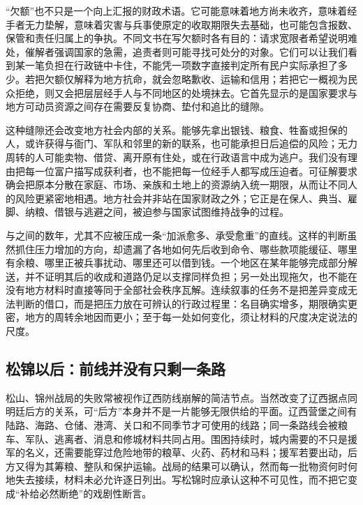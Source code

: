 “欠额”也不只是一个向上汇报的财政术语。它可能意味着地方尚未收齐，意味着经手者无力垫解，意味着灾害与兵事使原定的收取期限失去基础，也可能包含报数、保管和责任归属上的争执。不同文书在写欠额时各有目的：请求宽限者希望说明难处，催解者强调国家的急需，追责者则可能寻找可处分的对象。它们可以让我们看到某一笔负担在行政链中卡住，不能凭一项数字直接判定所有民户实际承担了多少。若把欠额仅解释为地方抗命，就会忽略歉收、运输和信用；若把它一概视为民众拒绝，则又会把层层经手人与不同地区的处境抹去。它首先显示的是国家要求与地方可动员资源之间存在需要反复协商、垫付和追比的缝隙。

这种缝隙还会改变地方社会内部的关系。能够先拿出银钱、粮食、牲畜或担保的人，或许获得与衙门、军队和邻里的新的联系，也可能承担日后追偿的风险；无力周转的人可能卖物、借贷、离开原有住处，或在行政语言中成为逃户。我们没有理由把每一位富户描写成获利者，也不能把每一位经手人都写成压迫者。可征解要求确会把原本分散在家庭、市场、亲族和土地上的资源纳入统一期限，从而让不同人的风险更紧密地相遇。地方社会并非站在国家财政之外；它正是在保人、典当、雇脚、纳粮、借银与逃避之间，被迫参与国家试图维持战争的过程。

与之间的数年，尤其不应被压成一条“加派愈多、承受愈重”的直线。这样的判断虽然抓住压力增加的方向，却遗漏了各地如何先后收到命令、哪些款项能缓征、哪里有余粮、哪里正被兵事扰动、哪里还可以借到钱。一个地区在某年能够完成部分解送，并不证明其后的收成和道路仍足以支撑同样负担；另一处出现拖欠，也不能在没有地方材料时直接等同于全部社会秩序瓦解。连续叙事的任务不是把差异变成无法判断的借口，而是把压力放在可辨认的行政过程里：名目确实增多，期限确实更密，地方的周转余地因而更小；至于每一处如何变化，须让材料的尺度决定说法的尺度。

\subsection{松锦以后：前线并没有只剩一条路}

松山、锦州战局的失败常被视作辽西防线崩解的简洁节点。当然改变了辽西据点同明廷后方的关系，可“后方”本身并不是一片能够无限供给的平面。辽西营堡之间有陆路、海路、仓储、港湾、关口和不同季节才可使用的线路；同一条路线会被粮车、军队、逃离者、消息和修城材料共同占用。围困持续时，城内需要的不只是援军的名义，还需要能穿过危险地带的粮草、火药、药材和马料；援军若要出动，后方又得为其筹粮、整队和保护运输。战局的结果可以确认，然而每一批物资何时何地失去接续，材料未必允许逐日列出。写松锦时应承认这种不可见性，而不把它变成“补给必然断绝”的戏剧性断言。

